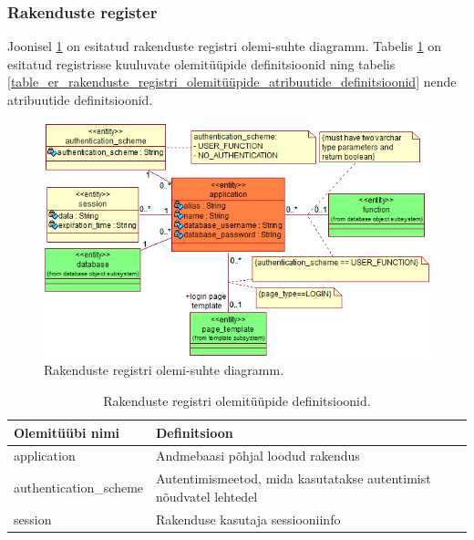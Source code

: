 \documentclass[a4paper,12pt]{article} %
\begin{document}
\subsubsection{Rakenduste register}
Joonisel \ref{fig_rakenduste_registri_olemi_suhte_diagramm} on esitatud rakenduste registri olemi-suhte diagramm. Tabelis \ref{table_er_rakenduste_registri_olemitüüpide_definitsioonid} on esitatud registrisse kuuluvate olemitüüpide definitsioonid ning tabelis \ref{table_er_rakenduste_registri_olemitüüpide_atribuutide_definitsioonid} nende atribuutide definitsioonid.

\begin{figure}[H]
\centering
\includegraphics[width=\textwidth]{./diagrams/applications-er-diagram.png}
\caption{Rakenduste registri olemi-suhte diagramm.}
\label{fig_rakenduste_registri_olemi_suhte_diagramm}
\end{figure}

\begin{table}[H]
\centering
\caption{Rakenduste registri olemitüüpide definitsioonid.}
\label{table_er_rakenduste_registri_olemitüüpide_definitsioonid}
\begin{tabular}{|p{4cm}|p{11cm}|}
\hline
\rowcolor{rowgray}
Olemitüübi nimi & Definitsioon \\ \hline
application & Andmebaasi põhjal loodud rakendus \\ \hline
authentication\_scheme & Autentimismeetod, mida kasutatakse autentimist nõudvatel lehtedel \\ \hline
session & Rakenduse kasutaja sessiooniinfo \\ \hline
\end{tabular}
\end{table}
\end{document}

